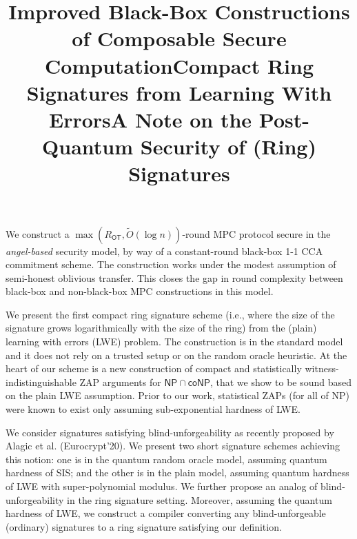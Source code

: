 \documentclass[margin]{res}
\begin{document}
\begin{resume}
\location{}
\title{\textbf{Improved Black-Box Constructions of Composable Secure Computation}}
\begin{position}
We construct a $\max(R_\mathsf{OT},\widetilde{O}(\log n))$-round  MPC protocol secure in the {\em angel-based} security model, by way of a constant-round black-box 1-1 CCA commitment scheme. The construction works under the modest assumption of semi-honest oblivious transfer. This closes the gap in round complexity between black-box and non-black-box MPC constructions in this model. 
\end{position}

\location{}
\vspace{1mm}
\title{\textbf{Compact Ring Signatures from Learning With Errors}}
\begin{position}
We present the first compact ring signature scheme (i.e., where the size of the signature grows logarithmically with the size of the ring) from the (plain) learning with errors (LWE) problem. The construction is in the standard model and it does not rely on a trusted setup or on the random oracle heuristic. At the heart of our scheme is a new construction of compact and statistically witness-indistinguishable ZAP arguments for $\mathsf{NP \cap coNP}$, that we show to be sound based on the plain LWE assumption. Prior to our work, statistical ZAPs (for all of NP) were known to exist only assuming sub-exponential hardness of LWE. 
\end{position}

\location{}
\vspace{1mm}
\title{\textbf{A Note on the Post-Quantum Security of (Ring) Signatures}}
\begin{position}
We consider signatures satisfying blind-unforgeability as recently proposed by Alagic et al. (Eurocrypt’20). We present two short signature schemes achieving this notion: one is in the quantum random oracle model, assuming quantum hardness of SIS; and the other is in the plain model, assuming quantum hardness of LWE with super-polynomial modulus. We further propose an analog of blind-unforgeability in the ring signature setting. Moreover, assuming the quantum hardness of LWE, we construct a compiler converting any blind-unforgeable (ordinary) signatures to a ring signature satisfying our definition.
\end{position}


\end{resume}
\end{document}
